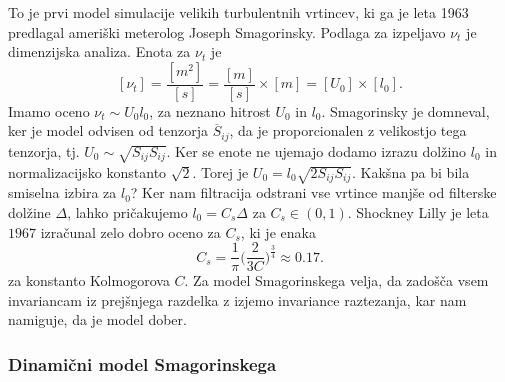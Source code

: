 \documentclass[mat2, tisk]{fmfdelo}
\begin{document}
To je prvi model simulacije velikih turbulentnih vrtincev, ki 
ga je leta 1963 predlagal ameriški meterolog Joseph Smagorinsky.
Podlaga za izpeljavo $\nu_t$ je dimenzijska analiza. Enota za $\nu_t$ je
$$
[\nu_t] = \frac{[m^2]}{[s]} = \frac{[m]}{[s]} \times [m] = [U_0] \times [l_0].
$$
Imamo oceno $\nu_t \sim U_0 l_0$, za neznano hitrost $U_0$ in $l_0$.
Smagorinsky je domneval, ker je model odvisen od tenzorja $\overline{S}_{ij}$, da je 
proporcionalen z velikostjo tega tenzorja, tj. $U_0 \sim \sqrt{S_{ij} S_{ij}}$.
Ker se enote ne ujemajo dodamo izrazu dolžino $l_0$ in normalizacijsko konstanto $\sqrt{2}$.
Torej je $U_0 = l_0\sqrt{2 S_{ij} S_{ij}}$. 
Kakšna pa bi bila smiselna izbira za $l_0$? Ker nam filtracija 
odstrani vse vrtince manjše od filterske dolžine $\Delta$, lahko 
pričakujemo $l_0 = C_s \Delta$ za $C_s\in (0, 1)$. Shockney Lilly je leta $1967$
izračunal zelo dobro oceno za $C_s$, ki je enaka 
$$
C_s = \frac{1}{\pi} \Big(\frac{2}{3C}\Big)^\frac{3}{4} \approx 0.17.
$$
za konstanto Kolmogorova $C$.
Za model Smagorinskega velja, da zadošča vsem invariancam iz prejšnjega razdelka
z izjemo invariance raztezanja, kar nam namiguje, da je model dober. 

\subsubsection{Dinamični model Smagorinskega}
\end{document}
